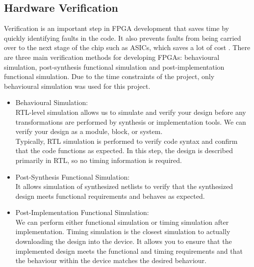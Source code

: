 \subsection{Hardware Verification}
Verification is an important step in FPGA development that saves time by quickly identifying faults in the code. It also prevents faults from being carried over to the next stage of the chip such as ASICs, which saves a lot of cost \cite{RN204}. There are three main verification methods for developing FPGAs: behavioural simulation, post-synthesis functional simulation and post-implementation functional simulation\cite{RN205}. Due to the time constraints of the project, only behavioural simulation was used for this project.
\begin{itemize}
    \item Behavioural Simulation:\\RTL-level simulation allows us to simulate and verify your design before any transformations are performed by synthesis or implementation tools. We can verify your design as a module, block, or system.\\
    Typically, RTL simulation is performed to verify code syntax and confirm that the code functions as expected. In this step, the design is described primarily in RTL, so no timing information is required.
    \item Post-Synthesis Functional Simulation:\\It allows simulation of synthesized netlists to verify that the synthesized design meets functional requirements and behaves as expected.
    \item Post-Implementation Functional Simulation:\\We can perform either functional simulation or timing simulation after implementation. Timing simulation is the closest simulation to actually downloading the design into the device. It allows you to ensure that the implemented design meets the functional and timing requirements and that the behaviour within the device matches the desired behaviour.
\end{itemize}
